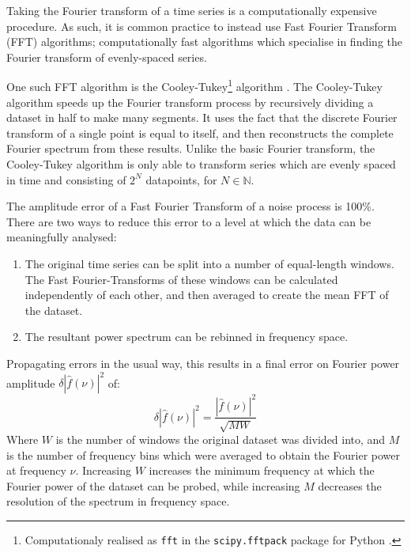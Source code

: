 \par Taking the Fourier transform of a time series is a computationally expensive procedure.  As such, it is common practice to instead use Fast Fourier Transform (FFT) algorithms; computationally fast algorithms which specialise in finding the Fourier transform of evenly-spaced series.
\par One such FFT algorithm is the Cooley-Tukey\footnote{Computationaly realised as \texttt{fft} in the \texttt{scipy.fftpack} package for Python \citep{NumPy}.} algorithm \citep{Cooley_FFT}.  The Cooley-Tukey algorithm speeds up the Fourier transform process by recursively dividing a dataset in half to make many segments.  It uses the fact that the discrete Fourier transform of a single point is equal to itself, and then reconstructs the complete Fourier spectrum from these results. Unlike the basic Fourier transform, the Cooley-Tukey algorithm is only able to transform series which are evenly spaced in time and consisting of $2^N$ datapoints, for $N\in\mathbb{N}$.
\par The amplitude error of a Fast Fourier Transform of a noise process is 100\%.  There are two ways to reduce this error to a level at which the data can be meaningfully analysed:
\begin{enumerate}
\item The original time series can be split into a number of equal-length windows.  The Fast Fourier-Transforms of these windows can be calculated independently of each other, and then averaged to create the mean FFT of the dataset.
\item The resultant power spectrum can be rebinned in frequency space.
\end{enumerate}
\par Propagating errors in the usual way, this results in a final error on Fourier power amplitude $\delta|\hat{f}(\nu)|^2$ of:
\begin{equation}
\delta|\hat{f}(\nu)|^2=\frac{|\hat{f}(\nu)|^2}{\sqrt{MW}}
\end{equation}
Where $W$ is the number of windows the original dataset was divided into, and $M$ is the number of frequency bins which were averaged to obtain the Fourier power at frequency $\nu$.  Increasing $W$ increases the minimum frequency at which the Fourier power of the dataset can be probed, while increasing $M$ decreases the resolution of the spectrum in frequency space.

